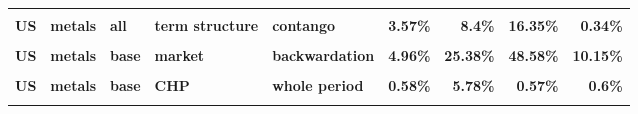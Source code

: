 \documentclass[
  authoryear,
  preprint,
  3p]{elsarticle}
\begin{document}
\begin{landscape}
\begin{longtable}[t]{>{}l>{}l>{}l>{}l>{}l>{}r>{}r>{}r>{}r}
\textbf{\cellcolor{gray!10}{US}} & \textbf{\cellcolor{gray!10}{metals}} & \textbf{\cellcolor{gray!10}{all}} & \textbf{\cellcolor{gray!10}{term structure}} & \textbf{\cellcolor{gray!10}{backwardation}} & \textcolor[HTML]{4285f4}{\textbf{\cellcolor{gray!10}{1.5\%}}} & \textcolor[HTML]{4285f4}{\textbf{\cellcolor{gray!10}{6.51\%}}} & \textcolor[HTML]{4285f4}{\textbf{\cellcolor{gray!10}{13.24\%}}} & \textcolor[HTML]{4285f4}{\textbf{\cellcolor{gray!10}{0.33\%}}}\\
\textbf{US} & \textbf{metals} & \textbf{all} & \textbf{term structure} & \textbf{contango} & \textcolor[HTML]{4285f4}{\textbf{3.57\%}} & \textcolor[HTML]{4285f4}{\textbf{8.4\%}} & \textcolor[HTML]{4285f4}{\textbf{16.35\%}} & \textcolor[HTML]{4285f4}{\textbf{0.34\%}}\\
\addlinespace
\textbf{\cellcolor{gray!10}{US}} & \textbf{\cellcolor{gray!10}{metals}} & \textbf{\cellcolor{gray!10}{base}} & \textbf{\cellcolor{gray!10}{market}} & \textbf{\cellcolor{gray!10}{whole period}} & \textcolor[HTML]{4285f4}{\textbf{\cellcolor{gray!10}{5.39\%}}} & \textcolor[HTML]{4285f4}{\textbf{\cellcolor{gray!10}{23.13\%}}} & \textcolor[HTML]{4285f4}{\textbf{\cellcolor{gray!10}{50.77\%}}} & \textcolor[HTML]{4285f4}{\textbf{\cellcolor{gray!10}{19.74\%}}}\\
\textbf{US} & \textbf{metals} & \textbf{base} & \textbf{market} & \textbf{backwardation} & \textcolor[HTML]{4285f4}{\textbf{4.96\%}} & \textcolor[HTML]{4285f4}{\textbf{25.38\%}} & \textcolor[HTML]{4285f4}{\textbf{48.58\%}} & \textcolor[HTML]{4285f4}{\textbf{10.15\%}}\\
\textbf{\cellcolor{gray!10}{US}} & \textbf{\cellcolor{gray!10}{metals}} & \textbf{\cellcolor{gray!10}{base}} & \textbf{\cellcolor{gray!10}{market}} & \textbf{\cellcolor{gray!10}{contango}} & \textcolor[HTML]{4285f4}{\textbf{\cellcolor{gray!10}{5.66\%}}} & \textcolor[HTML]{4285f4}{\textbf{\cellcolor{gray!10}{21.55\%}}} & \textcolor[HTML]{4285f4}{\textbf{\cellcolor{gray!10}{52.45\%}}} & \textcolor[HTML]{4285f4}{\textbf{\cellcolor{gray!10}{27.5\%}}}\\
\textbf{US} & \textbf{metals} & \textbf{base} & \textbf{CHP} & \textbf{whole period} & \textcolor[HTML]{4285f4}{\textbf{0.58\%}} & \textcolor[HTML]{4285f4}{\textbf{5.78\%}} & \textcolor[HTML]{4285f4}{\textbf{0.57\%}} & \textcolor[HTML]{4285f4}{\textbf{0.6\%}}\\
\textbf{\cellcolor{gray!10}{US}} & \textbf{\cellcolor{gray!10}{metals}} & \textbf{\cellcolor{gray!10}{base}} & \textbf{\cellcolor{gray!10}{CHP}} & \textbf{\cellcolor{gray!10}{backwardation}} & \textcolor[HTML]{4285f4}{\textbf{\cellcolor{gray!10}{1.4\%}}} & \textcolor[HTML]{4285f4}{\textbf{\cellcolor{gray!10}{5.18\%}}} & \textcolor[HTML]{4285f4}{\textbf{\cellcolor{gray!10}{1.91\%}}} & \textcolor[HTML]{4285f4}{\textbf{\cellcolor{gray!10}{0.29\%}}}\\

\end{longtable}
\end{landscape}
\end{document}
